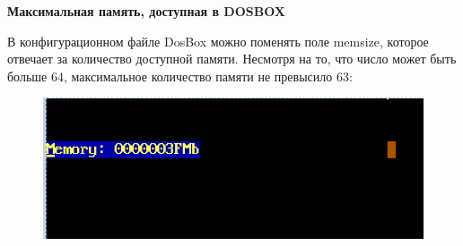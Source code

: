 \begin{center}
	{\bf\normalsize Максимальная память, доступная в DOSBOX}
\end{center}

В конфигурационном файле DosBox можно поменять поле memsize, которое отвечает за количество доступной памяти.
Несмотря на то, что число может быть больше 64, максимальное количество памяти не превысило 63:

\begin{figure}[!ht]
	\begin{center}
		\includegraphics[width=16cm]{inc/limit.png}
	\end{center}
\end{figure}